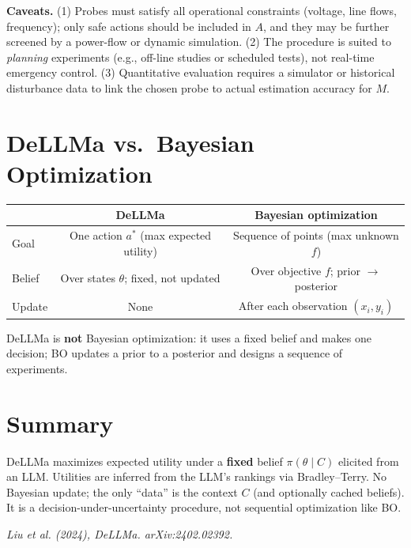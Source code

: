 \documentclass[11pt]{article}
\begin{document}
\textbf{Caveats.} (1) Probes must satisfy all operational constraints (voltage, line flows, frequency); only safe actions should be included in $A$, and they may be further screened by a power-flow or dynamic simulation. (2) The procedure is suited to \emph{planning} experiments (e.g., off-line studies or scheduled tests), not real-time emergency control. (3) Quantitative evaluation requires a simulator or historical disturbance data to link the chosen probe to actual estimation accuracy for $M$.

\section{DeLLMa vs.\ Bayesian Optimization}

\begin{center}
\begin{tabular}{|l|c|c|}
\hline
& \textbf{DeLLMa} & \textbf{Bayesian optimization} \\
\hline
Goal & One action $a^*$ (max expected utility) & Sequence of points (max unknown $f$) \\
\hline
Belief & Over states $\theta$; fixed, not updated & Over objective $f$; prior $\to$ posterior \\
\hline
Update & None & After each observation $(x_i,y_i)$ \\
\hline
\end{tabular}
\end{center}

DeLLMa is \textbf{not} Bayesian optimization: it uses a fixed belief and makes one decision; BO updates a prior to a posterior and designs a sequence of experiments.

\section{Summary}

DeLLMa maximizes expected utility under a \textbf{fixed} belief $\pi(\theta\mid C)$ elicited from an LLM. Utilities are inferred from the LLM's rankings via Bradley--Terry. No Bayesian update; the only ``data'' is the context $C$ (and optionally cached beliefs). It is a decision-under-uncertainty procedure, not sequential optimization like BO.

\vspace{0.5em}
\noindent\textit{Liu et al. (2024), DeLLMa. arXiv:2402.02392.}
\end{document}
